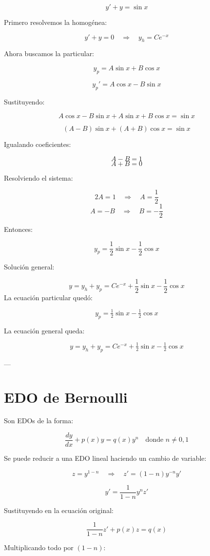 \documentclass[a4paper,12pt]{article}
\begin{document}
\[
y' + y = \sin x
\]

Primero resolvemos la homogénea:

\[
y' + y = 0 \quad \Rightarrow \quad y_h = C e^{-x}
\]

Ahora buscamos la particular:

\[
y_p = A \sin x + B \cos x
\]

\[
y_p' = A \cos x - B \sin x
\]

Sustituyendo:

\[
A \cos x - B \sin x + A \sin x + B \cos x = \sin x
\]

\[
(A - B) \sin x + (A + B) \cos x = \sin x
\]

Igualando coeficientes:

\[
A - B = 1
\]
\[
A + B = 0
\]

Resolviendo el sistema:

\[
2A = 1 \quad \Rightarrow \quad A = \frac{1}{2}
\]
\[
A = -B \quad \Rightarrow \quad B = -\frac{1}{2}
\]

Entonces:

\[
y_p = \frac{1}{2} \sin x - \frac{1}{2} \cos x
\]

Solución general:

\[
y = y_h + y_p = C e^{-x} + \frac{1}{2} \sin x - \frac{1}{2} \cos x
\]
La ecuación particular quedó:

\[
y_p = \tfrac{1}{2}\sin x - \tfrac{1}{2}\cos x
\]

La ecuación general queda:

\[
y = y_h + y_p = C e^{-x} + \tfrac{1}{2}\sin x - \tfrac{1}{2}\cos x
\]

---

\section*{EDO de Bernoulli}

Son EDOs de la forma:

\[
\frac{dy}{dx} + p(x)y = q(x) y^n \quad \text{donde } n \neq 0,1
\]

Se puede reducir a una EDO lineal haciendo un cambio de variable:

\[
z = y^{1-n} \quad \Rightarrow \quad z' = (1 - n) y^{-n} y'
\]

\[
y' = \frac{1}{1 - n} y^n z'
\]

Sustituyendo en la ecuación original:

\[
\frac{1}{1 - n} z' + p(x) z = q(x)
\]

Multiplicando todo por $(1 - n)$:
\end{document}
